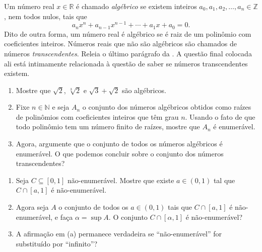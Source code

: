 \begin{exercise}\label{ex:numeros-algebricos}
Um número real $x \in \mathbb{R}$ é chamado \textit{algébrico} se existem inteiros $a_{0}, a_{1}, a_{2}, \ldots, a_{n} \in \mathbb{Z}$, nem todos nulos, tais que  
\[
a_{n} x^{n} + a_{n-1} x^{n-1} + \cdots + a_{1} x + a_{0} = 0.
\]
Dito de outra forma, um número real é algébrico se é raiz de um polinômio com coeficientes inteiros. Números reais que não são algébricos são chamados de números \textit{transcendentes}. Releia o último parágrafo da . A questão final colocada ali está intimamente relacionada à questão de saber se números transcendentes existem. 
\begin{enumerate}[label=\alph*)]
\item Mostre que $\sqrt{2}$, $\sqrt[3]{2}$ e $\sqrt{3} + \sqrt{2}$ são algébricos.
\item Fixe $n \in \mathbb{N}$ e seja $A_{n}$ o conjunto dos números algébricos obtidos como raízes de polinômios com coeficientes inteiros que têm grau $n$. Usando o fato de que todo polinômio tem um número finito de raízes, mostre que $A_{n}$ é enumerável.  
\item Agora, argumente que o conjunto de todos os números algébricos é enumerável. O que podemos concluir sobre o conjunto dos números transcendentes?
\end{enumerate}
\end{exercise}

\begin{exercise}\label{ex:corte-nao-enumeravel}
\begin{enumerate}[label=\alph*)]
\item Seja $C \subseteq [0, 1]$ não-enumerável. Mostre que existe $a \in (0, 1)$ tal que $C \cap [a, 1]$ é não-enumerável.
\item Agora seja $A$ o conjunto de todos os $a \in (0, 1)$ tais que $C \cap [a, 1]$ é não-enumerável, e faça $\alpha = \sup A$. O conjunto $C \cap [\alpha, 1]$ é não-enumerável?
\item A afirmação em (a) permanece verdadeira se ``não-enumerável'' for substituído por ``infinito''?
\end{enumerate}
\end{exercise}


